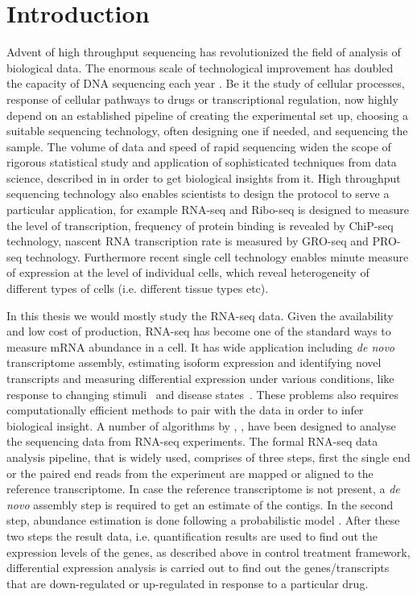 \chapter{Introduction}
Advent of high throughput sequencing has revolutionized the field of analysis of biological data. The enormous scale of technological improvement has doubled the capacity of DNA sequencing each year \citep{reuter2015high}. Be it the study of cellular processes, response of cellular pathways to drugs or transcriptional regulation, now highly depend on an established pipeline of creating the experimental set up, choosing a suitable sequencing technology, often designing one if needed, and sequencing the sample. The volume of data and speed of rapid sequencing widen the scope of rigorous statistical study and application of sophisticated techniques from data science, described in \citep{schatz2015biological} in order to get biological insights from it. High throughput sequencing technology also enables scientists to design the protocol to serve a particular application, for example RNA-seq \citep{mortazavi2008mapping} and Ribo-seq \citep{gerashchenko2012genome} is designed to measure the level of transcription, frequency of protein binding is revealed by ChiP-seq \citep{zhang2008model} technology, nascent RNA transcription rate is measured by GRO-seq and PRO-seq \citep{core2008nascent} technology. Furthermore recent single cell technology enables minute measure of expression at the level of individual cells, which reveal heterogeneity of different types of cells (i.e. different tissue types etc). 

In this thesis we would mostly study the RNA-seq data. Given the availability and low cost of production, RNA-seq has become one of the standard ways to measure mRNA abundance in a cell. It has wide application including {\it de novo} transcriptome assembly, estimating isoform expression and identifying novel transcripts and measuring differential expression under various conditions, like response to changing stimuli~\citep{Stubben2014} and disease states~\citep{diseaseDGE}. These problems also requires computationally efficient methods to pair with the data in order to infer biological insight. A number of algorithms by \citep{langmead2009ultrafast}, \citep{tophat}, \citep{mortazavi2008mapping} have been designed to analyse the sequencing data from RNA-seq experiments. The formal RNA-seq data analysis pipeline, that is widely used, comprises of three steps, first the single end or the paired end reads from the experiment are mapped or aligned to the reference transcriptome. In case the reference transcriptome is not present, a {\it de novo} assembly step is required to get an estimate of the contigs. In the second step, abundance estimation is done following a probabilistic model \citep{pachter2011models}. After these two steps the result data, i.e. quantification results are used to find out the expression levels of the genes, as described above in control treatment framework, differential expression analysis is carried out to find out the genes/transcripts that are down-regulated or up-regulated in response to a particular drug. 

